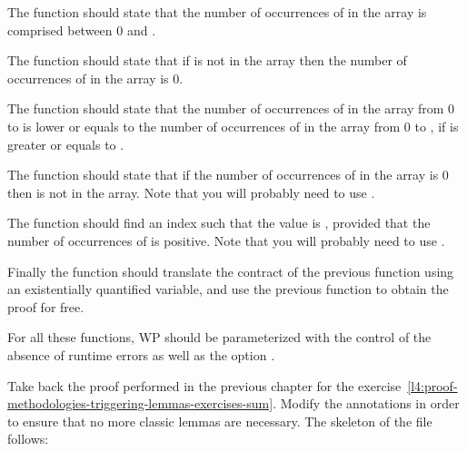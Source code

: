 

The function  should state that the number of
occurrences of  in the array is comprised between 0 and
.


The function  should state that if  is
not in the array then the number of occurrences of  in the array
is 0.


The function  should state that the number of
occurrences of  in the array from 0 to  is lower
or equals to the number of occurrences of  in the array from 0
to , if  is greater or equals to
.


The function  should state that if the number of
occurrences of  in the array is 0 then  is not in
the array. Note that you will probably need to use .


The function  should find an index 
such that the value  is , provided that the
number of occurrences of  is positive. Note that you will
probably need to use .


Finally the function  should translate the contract
of the previous function using an existentially quantified variable, and use the
previous function to obtain the proof for free.


For all these functions, WP should be parameterized with the control of the
absence of runtime errors as well as the option
.




Take back the proof performed in the previous chapter for the
exercise~\ref{l4:proof-methodologies-triggering-lemmas-exercises-sum}. Modify
the annotations in order to ensure that no more classic lemmas are necessary.
The skeleton of the file follows:


